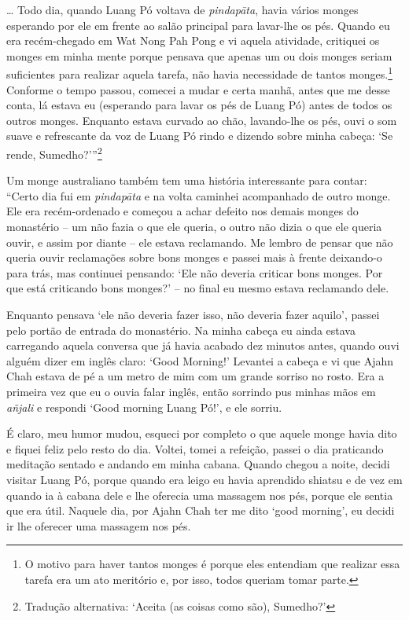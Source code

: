 \ldots{} Todo dia, quando Luang Pó voltava de \emph{pindapāta}, havia
vários monges esperando por ele em frente ao salão principal para
lavar-lhe os pés. Quando eu era recém-chegado em Wat Nong Pah Pong e vi
aquela atividade, critiquei os monges em minha mente porque pensava que
apenas um ou dois monges seriam suficientes para realizar aquela tarefa,
não havia necessidade de tantos monges.\footnote{O motivo para haver
  tantos monges é porque eles entendiam que realizar essa tarefa era um
  ato meritório e, por isso, todos queriam tomar parte.} Conforme o
tempo passou, comecei a mudar e certa manhã, antes que me desse conta,
lá estava eu (esperando para lavar os pés de Luang Pó) antes de todos os
outros monges. Enquanto estava curvado ao chão, lavando-lhe os pés, ouvi
o som suave e refrescante da voz de Luang Pó rindo e dizendo sobre minha
cabeça: `Se rende, Sumedho?'\thinspace ''\footnote{Tradução alternativa: `Aceita (as
  coisas como são), Sumedho?'}

Um monge australiano também tem uma história interessante para contar:
``Certo dia fui em \emph{pindapāta} e na volta caminhei acompanhado de
outro monge. Ele era recém-ordenado e começou a achar defeito nos demais
monges do monastério -- um não fazia o que ele queria, o outro não dizia
o que ele queria ouvir, e assim por diante -- ele estava reclamando. Me
lembro de pensar que não queria ouvir reclamações sobre bons monges e
passei mais à frente deixando-o para trás, mas continuei pensando: `Ele
não deveria criticar bons monges. Por que está criticando bons monges?'
-- no final eu mesmo estava reclamando dele.

Enquanto pensava `ele não deveria fazer isso, não deveria fazer aquilo',
passei pelo portão de entrada do monastério. Na minha cabeça eu ainda
estava carregando aquela conversa que já havia acabado dez minutos
antes, quando ouvi alguém dizer em inglês claro: `Good Morning!'
Levantei a cabeça e vi que Ajahn Chah estava de pé a um metro de mim com
um grande sorriso no rosto. Era a primeira vez que eu o ouvia falar
inglês, então sorrindo pus minhas mãos em \emph{añjali} e respondi `Good
morning Luang Pó!', e ele sorriu.

É claro, meu humor mudou, esqueci por completo o que aquele monge havia
dito e fiquei feliz pelo resto do dia. Voltei, tomei a refeição, passei
o dia praticando meditação sentado e andando em minha cabana. Quando
chegou a noite, decidi visitar Luang Pó, porque quando era leigo eu
havia aprendido shiatsu e de vez em quando ia à cabana dele e lhe
oferecia uma massagem nos pés, porque ele sentia que era útil. Naquele
dia, por Ajahn Chah ter me dito `good morning', eu decidi ir lhe
oferecer uma massagem nos pés.

